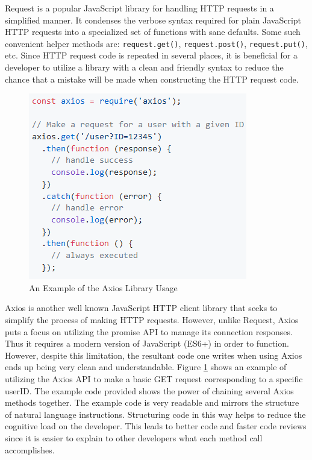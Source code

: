 \documentclass[12pt]{report}
\begin{document}
Request is a popular JavaScript library for handling HTTP requests in a simplified manner. It condenses the verbose syntax required for plain JavaScript HTTP requests into a specialized set of functions with sane defaults. Some such convenient helper methods are: \texttt{request.get()}, \texttt{request.post()}, \texttt{request.put()}, etc. Since HTTP request code is repeated in several places, it is beneficial for a developer to utilize a library with a clean and friendly syntax to reduce the chance that a mistake will be made when constructing the HTTP request code.

\begin{figure}[h]
	\centering
	\includegraphics[scale=0.5]{axios_example}
	\caption{An Example of the Axios Library Usage}
	\label{fig:axiosexample}
\end{figure}

Axios is another well known JavaScript HTTP client library that seeks to simplify the process of making HTTP requests. However, unlike Request, Axios puts a focus on utilizing the promise API to manage its connection responses. Thus it requires a modern version of JavaScript (ES6+) in order to function. However, despite this limitation, the resultant code one writes when using Axios ends up being very clean and understandable. Figure \ref{fig:axiosexample} shows an example of utilizing the Axios API to make a basic GET request corresponding to a specific userID.\cite{axiosgithub} The example code provided shows the power of chaining several Axios methods together. The example code is very readable and mirrors the structure of natural language instructions. Structuring code in this way helps to reduce the cognitive load on the developer. This leads to better code and faster code reviews since it is easier to explain to other developers what each method call accomplishes.
\end{document}
